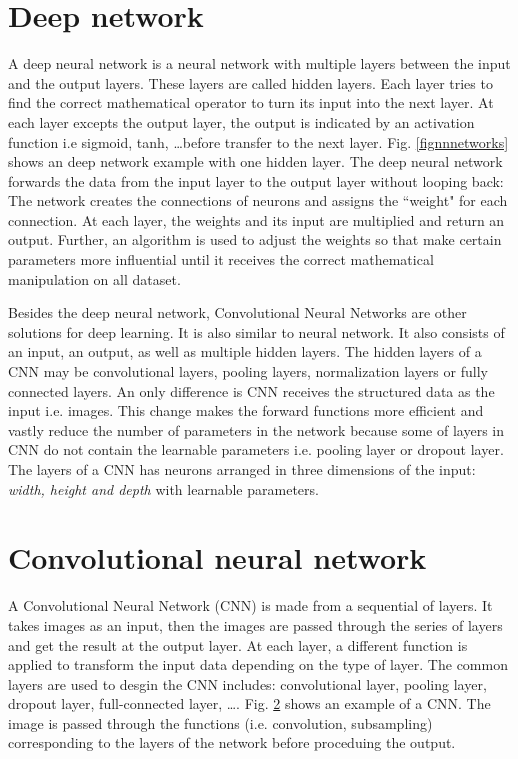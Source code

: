 \section{Deep network}
A deep neural network is a neural network with multiple layers between the input and the output layers. These layers are called hidden layers. Each layer tries to find the correct mathematical operator to turn its input into the next layer. At each layer excepts the output layer, the output is indicated by an activation function i.e sigmoid, tanh, \ldots before transfer to the next layer. Fig. \ref{fignnnetworks} shows an deep network example with one hidden layer. The deep neural network forwards the data from the input layer to the output layer without looping back: The network creates the connections of neurons and assigns the ``weight" for each connection. At each layer, the weights and its input are multiplied and return an output. Further, an algorithm is used to adjust the weights so that make certain parameters more influential until it receives the correct mathematical manipulation on all dataset.

Besides the deep neural network, Convolutional Neural Networks are other solutions for deep learning. It is also similar to neural network. It also consists of an input, an output, as well as multiple hidden layers. The hidden layers of a CNN may be convolutional layers, pooling layers, normalization layers or fully connected layers. An only difference is CNN receives the structured data as the input i.e. images. This change makes the forward functions more efficient and vastly reduce the number of parameters in the network because some of layers in CNN do not contain the learnable parameters i.e. pooling layer or dropout layer. The layers of a CNN has neurons arranged in three dimensions of the input: \textit{width, height and depth} with learnable parameters.

\section{Convolutional neural network}
A Convolutional Neural Network (CNN) is made from a sequential of layers. It takes images as an input, then the images are passed through the series of layers and get the result at the output layer. At each layer, a different function is applied to transform the input data depending on the type of layer. The common layers are used to desgin the CNN includes: convolutional layer, pooling layer, dropout layer, full-connected layer, \ldots. Fig. \ref{} shows an example of a CNN. The image is passed through the functions (i.e. convolution, subsampling) corresponding to the layers of the network before proceduing the output.
